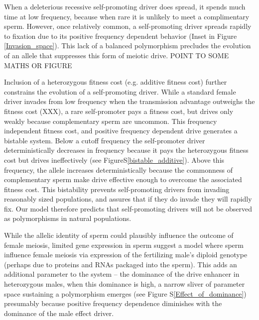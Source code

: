 \documentclass[12pt,letterpaper]{article}
\newcommand{\gc}[1]{{ \color{red} #1}}
\newcommand{\yb}[1]{{ \color{blue} #1}}
\begin{document}
When a deleterious recessive self-promoting driver does spread, 
	it spends much time at low frequency, because when rare it is unlikely to meet a complimentary sperm. 
However, once relatively common, a self-promoting driver spreads rapidly to fixation due to its
	positive frequency dependent behavior (Inset in Figure \ref{Invasion_space}).  
This lack of a balanced polymorphism precludes the evolution of an allele that suppresses this form of meiotic drive.
\yb{POINT TO SOME MATHS OR FIGURE}



Inclusion of a heterozygous fitness cost (e.g. additive fitness cost) further constrains the evolution of a self-promoting driver. 
While a  standard female  driver invades from low frequency when the transmission advantage outweighs the fitness cost (XXX),
	a rare self-promoter pays a fitness cost, but drives only weakly because complementary sperm are uncommon. 
This frequency independent fitness cost, and positive frequency dependent drive generates a bistable system. 
Below a cutoff frequency the self-promoter driver deterministically decreases in frequency 
	because it pays the  heterozygous fitness cost  but drives ineffectively (see FigureS\ref{bistable_additive}). 
Above this frequency, the allele increases deterministically because the commonness of complementary sperm 
	make drive effective enough to overcome the associated fitness cost.
This bistability prevents self-promoting drivers from invading 	
	reasonably sized populations, and assures that if they do invade they will rapidly fix.
\yb{Our model therefore predicts that self-promoting drivers will not be observed as polymorphisms in natural populations. }


While the allelic identity of sperm could plausibly influence the outcome of female meiosis, 
	limited gene expression in sperm \citep[e.g.][]{Joseph2004}
	suggest a model where sperm influence female meiosis via expression of the fertilizing male's
	diploid genotype (perhaps due to proteins and RNAs packaged into the sperm).
This adds an additional parameter to the system -- the dominance of the drive enhancer in heterozygous males, 
	when this dominance is high, a narrow sliver of parameter space sustaining a polymorphism emerges (see Figure S\ref{Effect_of_dominance})
 	\yb{presumably because positive frequency dependence diminishes with the dominance of the male effect driver.}

\end{document}
